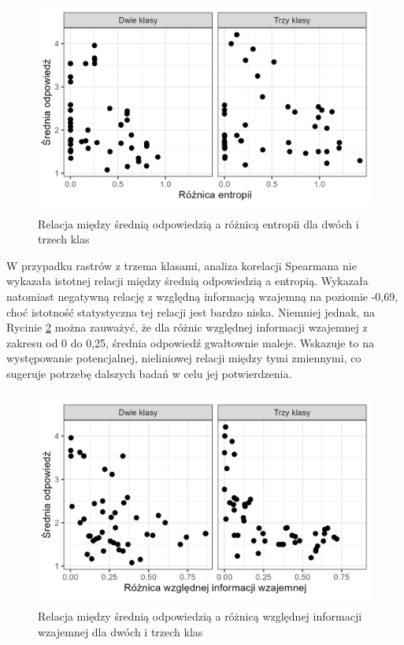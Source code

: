 \documentclass{amuthesis}
\begin{document}
\begin{figure}[t]

{\centering \includegraphics[width=4.6875in,height=2.8125in]{figures/answer_mean_vs_ent_diff.png}

}

\caption{\label{fig-answer_mean_vs_ent_diff}Relacja między średnią
odpowiedzią a różnicą entropii dla dwóch i trzech klas}

\end{figure}

W przypadku rastrów z trzema klasami, analiza korelacji Spearmana nie
wykazała istotnej relacji między średnią odpowiedzią a entropią.
Wykazała natomiast negatywną relację z względną informacją wzajemną na
poziomie -0,69, choć istotność statystyczna tej relacji jest bardzo
niska. Niemniej jednak, na Rycinie
\ref{fig-answer_mean_vs_relmutinf_diff} można zauważyć, że dla różnic
względnej informacji wzajemnej z zakresu od 0 do 0,25, średnia odpowiedź
gwałtownie maleje. Wskazuje to na występowanie potencjalnej, nieliniowej
relacji między tymi zmiennymi, co sugeruje potrzebę dalszych badań w
celu jej potwierdzenia.

\begin{figure}[t]

{\centering \includegraphics[width=4.6875in,height=2.8125in]{figures/answer_mean_vs_relmutinf_diff.png}

}

\caption{\label{fig-answer_mean_vs_relmutinf_diff}Relacja między średnią
odpowiedzią a różnicą względnej informacji wzajemnej dla dwóch i trzech
klas}

\end{figure}
\end{document}
